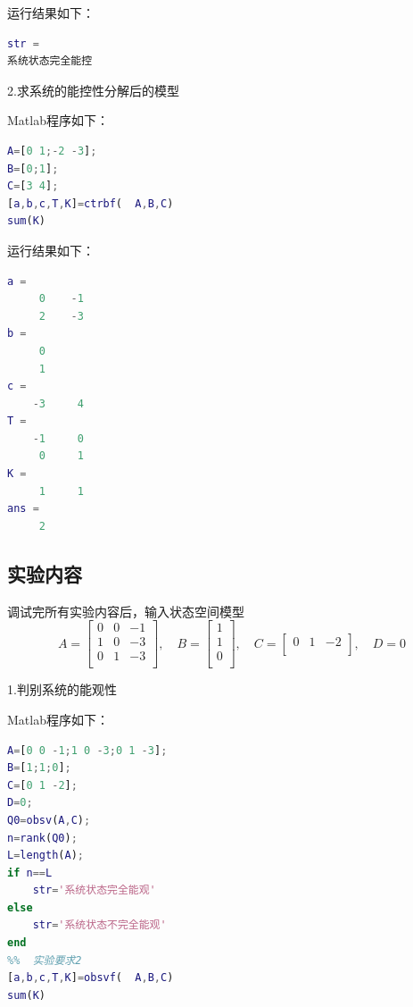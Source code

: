 \documentclass[UTF8]{ctexart}
\begin{document}
\par 运行结果如下：		
\par  \begin{lstlisting}[language=matlab,escapeinside=``]		
str =
系统状态完全能控		
\end{lstlisting}			
		
\par 2.求系统的能控性分解后的模型		
\par Matlab程序如下：
\par  \begin{lstlisting}[language=matlab,escapeinside=``]			
A=[0 1;-2 -3];
B=[0;1];
C=[3 4];
[a,b,c,T,K]=ctrbf(  A,B,C)
sum(K)		
\end{lstlisting}			
		
\par 运行结果如下：		
\par  \begin{lstlisting}[language=matlab,escapeinside=``]		
a =
     0    -1
     2    -3
b =
     0
     1
c =
    -3     4
T =
    -1     0
     0     1
K =
     1     1
ans =
     2
\end{lstlisting}			
		
\subsection{实验内容 }
\par 调试完所有实验内容后，输入状态空间模型
\begin{equation}
    A=\begin{bmatrix}
    0 & 0 & -1\\
    1 & 0 & -3\\
    0 & 1 & -3\\ \end{bmatrix}  , \quad B=\begin{bmatrix}
   1\\
   1\\
   0\\ \end{bmatrix}   , \quad  C=\begin{bmatrix}
   0 & 1 & -2\\ \end{bmatrix}  , \quad D=0
\end{equation}

\par 1.判别系统的能观性
\par Matlab程序如下：
\par  \begin{lstlisting}[language=matlab,escapeinside=``]	
A=[0 0 -1;1 0 -3;0 1 -3];
B=[1;1;0];
C=[0 1 -2];
D=0;
Q0=obsv(A,C);
n=rank(Q0);
L=length(A);
if n==L
    str='系统状态完全能观'
else 
    str='系统状态不完全能观'
end
%%  实验要求2
[a,b,c,T,K]=obsvf(  A,B,C)
sum(K)
\end{lstlisting}	
\end{document}

